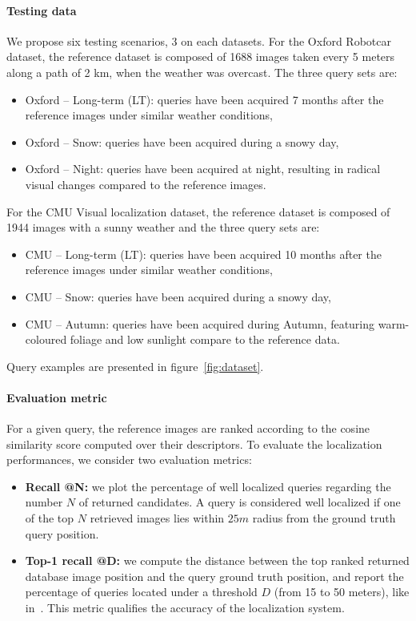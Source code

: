 \paragraph{Testing data}

We propose six testing scenarios, 3 on each datasets. For the Oxford Robotcar dataset, the reference dataset is composed of 1688 images taken every 5 meters along a path of 2 km, when the weather was overcast. The three query sets are:
\begin{itemize}
	\item {Oxford -- Long-term (LT):} queries have been acquired 7 months after the reference images under similar weather conditions,
	\item {Oxford -- Snow:} queries have been acquired during a snowy day,
	\item {Oxford -- Night:} queries have been acquired at night, resulting in radical visual changes compared to the reference images.
\end{itemize}

For the CMU Visual localization dataset, the reference dataset is composed of 1944 images with a sunny weather and the three query sets are:
\begin{itemize}
	\item {CMU -- Long-term (LT):} queries have been acquired 10 months after the reference images under similar weather conditions,
	\item {CMU -- Snow:} queries have been acquired during a snowy day,
	\item {CMU -- Autumn:} queries have been acquired during Autumn, featuring warm-coloured foliage and low sunlight compare to the reference data.
\end{itemize}

\noindent Query examples are presented in figure~\ref{fig:dataset}.
	
\paragraph{Evaluation metric}
For a given query, the reference images are ranked according to the cosine similarity score computed over their descriptors. To evaluate the localization performances, we consider two evaluation metrics:
\begin{itemize}
	\item \textbf{Recall @N:} we plot the percentage of well localized queries regarding the number $N$ of returned candidates. A query is considered well localized if one of the top $N$ retrieved images lies within $25m$ radius from the ground truth query position.
	\item \textbf{Top-1 recall @D:} we compute the distance between the top ranked returned database image position and the query ground truth position, and report the percentage of queries located under a threshold $D$ (from 15 to 50 meters), like in~\cite{Zamir2014}. This metric qualifies the accuracy of the localization system.
\end{itemize}


